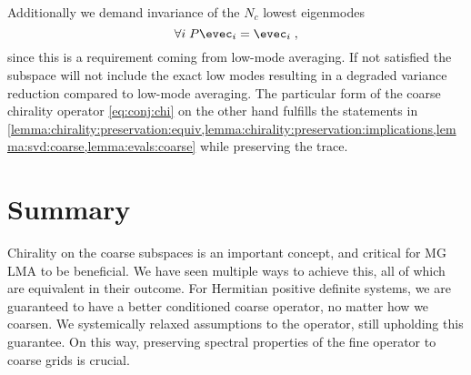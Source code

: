 Additionally we demand invariance of the $N_c$ lowest eigenmodes
\begin{equation} \label{eq:conj:modes}
\forall i \; P \evec_i = \evec_i \;,
\end{equation}
since this is a requirement coming from low-mode averaging.
If not satisfied the subspace will not include the exact low modes resulting in a degraded variance reduction compared to low-mode averaging.
The particular form of the coarse chirality operator \cref{eq:conj:chi} on the other hand fulfills the statements in \cref{lemma:chirality:preservation:equiv,lemma:chirality:preservation:implications,lemma:svd:coarse,lemma:evals:coarse} while preserving the trace.

\section{Summary}
\label{sec:chirality:summary}

Chirality on the coarse subspaces is an important concept, and critical for MG LMA to be beneficial.
We have seen multiple ways to achieve this, all of which are equivalent in their outcome.
For Hermitian positive definite systems, we are guaranteed to have a better conditioned coarse operator, no matter how we coarsen.
We systemically relaxed assumptions to the operator, still upholding this guarantee.
On this way, preserving spectral properties of the fine operator to coarse grids is crucial.

